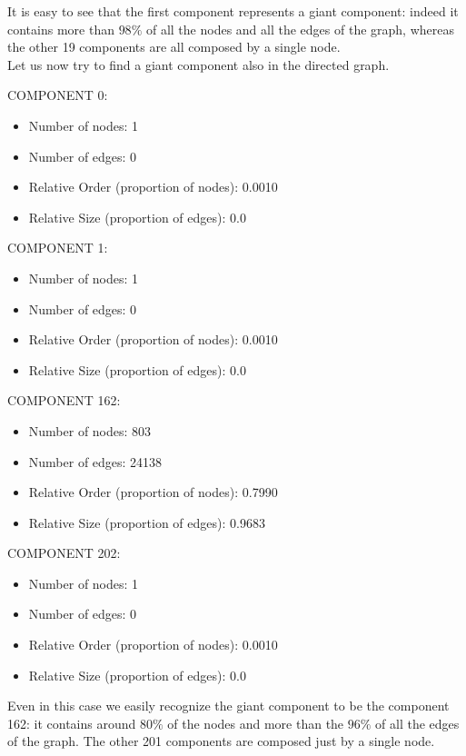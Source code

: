 \documentclass{report}
\theoremstyle{definition}
\theoremstyle{remark}
\begin{document}
It is easy to see that the first component represents a giant component: indeed it contains more than $98\%$ of all the nodes and all the edges of the graph, whereas the other 19 components are all composed by a single node.\\
Let us now try to find a giant component also in the directed graph.
\bigskip 

COMPONENT 0:
\begin{itemize}
	\item Number of nodes: 1
	\item Number of edges: 0
	\item Relative Order (proportion of nodes): 0.0010
	\item Relative Size (proportion of edges): 0.0\\
\end{itemize}

COMPONENT 1:
\begin{itemize}
	\item Number of nodes: 1
	\item Number of edges: 0
	\item Relative Order (proportion of nodes): 0.0010
	\item Relative Size (proportion of edges): 0.0\\
\end{itemize}


COMPONENT 162:
\begin{itemize}
	\item Number of nodes: 803
	\item Number of edges: 24138
	\item Relative Order (proportion of nodes): 0.7990
	\item Relative Size (proportion of edges): 0.9683\\
\end{itemize}


COMPONENT 202:
\begin{itemize}
	\item Number of nodes: 1
	\item Number of edges: 0
	\item Relative Order (proportion of nodes): 0.0010
	\item Relative Size (proportion of edges): 0.0\\
\end{itemize}

Even in this case we easily recognize the giant component to be the component 162: it contains around $80\%$ of the nodes and more than the $96\%$ of all the edges of the graph. The other 201 components are composed just by a single node.
\end{document}
